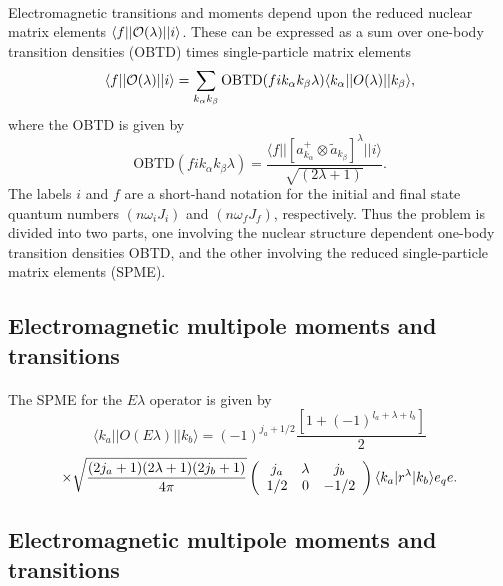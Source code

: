 \documentclass[%
oneside,                 %
final,                   %
10pt]{article}
\begin{document}
\paragraph{}
Electromagnetic transitions and moments depend upon the reduced nuclear
matrix elements $\langle f\vert\vert {\cal O}(\lambda )\vert\vert i\rangle$. These can be expressed as a sum over one-body transition
densities (OBTD) times single-particle matrix elements
\[
\langle f\vert\vert {\cal O}(\lambda )\vert\vert i\rangle
=\sum _{k_{\alpha } k_{\beta }}\mathrm{OBTD}(f i k_{\alpha } k_{\beta } \lambda )
 \langle k_{\alpha }\vert\vert O(\lambda )\vert\vert k_{\beta }\rangle, 
\]
where the OBTD is given by
\[
\mathrm{OBTD}(f i k_{\alpha} k_{\beta}\lambda)= \frac{\langle f\vert\vert [a^{+}_{k_{\alpha }}\otimes \tilde{a}_{k_{\beta }}]^{\lambda }\vert\vert i\rangle}{\sqrt{(2\lambda +1)}}. 
\]
The labels $i$ and $f$ are a short-hand notation for the initial
and final state quantum numbers $(n \omega _{i}J_{i})$ and $(n\omega_{f}J_{f})$,
respectively. Thus the problem is divided into two parts, one
involving the nuclear structure dependent one-body transition
densities OBTD, and the other involving the reduced
single-particle matrix
elements (SPME).





\subsection{Electromagnetic multipole moments and transitions}

\paragraph{}
The SPME for the $E\lambda$ operator is given by
\[
\langle k_{a}\vert\vert O(E\lambda )\vert\vert k_{b}\rangle=(-1)^{j_{a}+1/2}\frac{[1+(-1)^{l_{a}+\lambda +l_{b}}]}{2}
\]
\[
 \times\sqrt{ {(2j_{a}+1)(2\lambda +1)(2j_{b}+1)\over4\pi }}\left(\begin{array}{ccc}  {j_{a}}&  {\lambda} &  {j_{b}}\\  {1/2} & {0}&  {-1/2}\end{array}\right)\langle k_{a}\vert r^{\lambda }\vert k_{b}\rangle e_{q} e.
\]



\subsection{Electromagnetic multipole moments and transitions}
\end{document}
